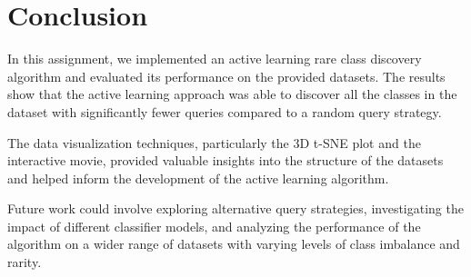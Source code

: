 \section{Conclusion}

In this assignment, we implemented an active learning rare class discovery algorithm and evaluated its performance on the provided datasets. The results show that the active learning approach was able to discover all the classes in the dataset with significantly fewer queries compared to a random query strategy.

The data visualization techniques, particularly the 3D t-SNE plot and the interactive movie, provided valuable insights into the structure of the datasets and helped inform the development of the active learning algorithm.

Future work could involve exploring alternative query strategies, investigating the impact of different classifier models, and analyzing the performance of the algorithm on a wider range of datasets with varying levels of class imbalance and rarity.